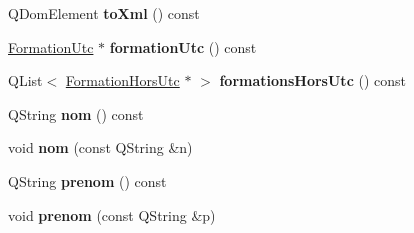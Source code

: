 \begin{DoxyCompactItemize}
\item 
\hypertarget{classEtudiant_a37a9b3c63cca4c58691148c3a6e8d0ea}{Q\+Dom\+Element {\bfseries to\+Xml} () const }\label{classEtudiant_a37a9b3c63cca4c58691148c3a6e8d0ea}

\item 
\hypertarget{classEtudiant_ad6cbf30a3f98b23890513f1c7c01ef21}{\hyperlink{classFormationUtc}{Formation\+Utc} $\ast$ {\bfseries formation\+Utc} () const }\label{classEtudiant_ad6cbf30a3f98b23890513f1c7c01ef21}

\item 
\hypertarget{classEtudiant_ada0c08dcc9bd1c85fd63f571de3d5609}{Q\+List$<$ \hyperlink{classFormationHorsUtc}{Formation\+Hors\+Utc} $\ast$ $>$ {\bfseries formations\+Hors\+Utc} () const }\label{classEtudiant_ada0c08dcc9bd1c85fd63f571de3d5609}

\item 
\hypertarget{classEtudiant_a964ede32b8795124017bf371ee362579}{Q\+String {\bfseries nom} () const }\label{classEtudiant_a964ede32b8795124017bf371ee362579}

\item 
\hypertarget{classEtudiant_ae820d0092a8a5b9c89cb96cdc42b76cc}{void {\bfseries nom} (const Q\+String \&n)}\label{classEtudiant_ae820d0092a8a5b9c89cb96cdc42b76cc}

\item 
\hypertarget{classEtudiant_ab4ea9ea62203ee83175eb9c82dac73cf}{Q\+String {\bfseries prenom} () const }\label{classEtudiant_ab4ea9ea62203ee83175eb9c82dac73cf}

\item 
\hypertarget{classEtudiant_ab32c80f9d28533c6bac546f80d74243c}{void {\bfseries prenom} (const Q\+String \&p)}\label{classEtudiant_ab32c80f9d28533c6bac546f80d74243c}

\end{DoxyCompactItemize}
